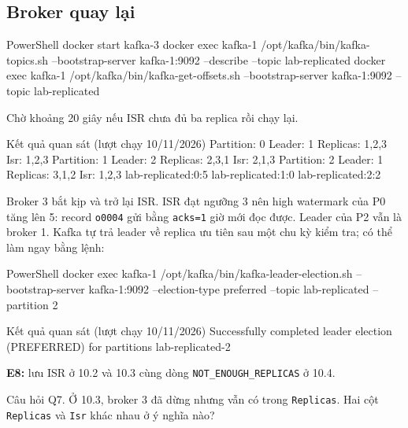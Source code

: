 \subsection{Broker quay lại}

\begin{aivncodebox}[language={}]{PowerShell}
docker start kafka-3
docker exec kafka-1 /opt/kafka/bin/kafka-topics.sh --bootstrap-server kafka-1:9092 --describe --topic lab-replicated
docker exec kafka-1 /opt/kafka/bin/kafka-get-offsets.sh --bootstrap-server kafka-1:9092 --topic lab-replicated
\end{aivncodebox}

Chờ khoảng 20 giây nếu ISR chưa đủ ba replica rồi chạy lại.


\begin{aivnCodeOutput}{Kết quả quan sát (lượt chạy 10/11/2026)}
Partition: 0  Leader: 1  Replicas: 1,2,3  Isr: 1,2,3
Partition: 1  Leader: 2  Replicas: 2,3,1  Isr: 2,1,3
Partition: 2  Leader: 1  Replicas: 3,1,2  Isr: 1,2,3
lab-replicated:0:5
lab-replicated:1:0
lab-replicated:2:2
\end{aivnCodeOutput}

Broker 3 bắt kịp và trở lại ISR. ISR đạt ngưỡng 3 nên high watermark của P0 tăng lên 5: record \texttt{o0004} gửi bằng \texttt{acks=\allowbreak{}1} giờ mới đọc được. Leader của P2 vẫn là broker 1. Kafka tự trả leader về replica ưu tiên sau một chu kỳ kiểm tra; có thể làm ngay bằng lệnh:


\begin{aivncodebox}[language={}]{PowerShell}
docker exec kafka-1 /opt/kafka/bin/kafka-leader-election.sh --bootstrap-server kafka-1:9092 --election-type preferred --topic lab-replicated --partition 2
\end{aivncodebox}

\begin{aivnCodeOutput}{Kết quả quan sát (lượt chạy 10/11/2026)}
Successfully completed leader election (PREFERRED) for partitions lab-replicated-2
\end{aivnCodeOutput}

\begin{evidencebox}
\textbf{E8:} lưu ISR ở 10.2 và 10.3 cùng dòng \texttt{NOT\_\allowbreak{}ENOUGH\_\allowbreak{}REPLICAS} ở 10.4.
\end{evidencebox}

\begin{questionbox}{Câu hỏi Q7.}
Ở 10.3, broker 3 đã dừng nhưng vẫn có trong \texttt{Replicas}. Hai cột \texttt{Replicas} và \texttt{Isr} khác nhau ở ý nghĩa nào?
\end{questionbox}

